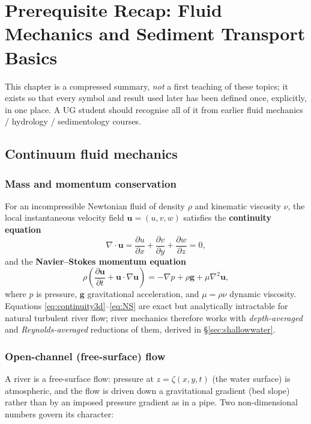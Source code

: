 \documentclass[11pt,a4paper]{report}
\theoremstyle{definition}
\theoremstyle{plain}
\theoremstyle{remark}
\newcommand{\pdv}[2]{\dfrac{\partial #1}{\partial #2}}
\newcommand{\vect}[1]{\boldsymbol{#1}}
\begin{document}
\chapter{Prerequisite Recap: Fluid Mechanics and Sediment Transport Basics}
\label{ch:prereq}

This chapter is a compressed summary, \emph{not} a first teaching of these topics; it exists so that every symbol and result used later has been defined once, explicitly, in one place. A UG student should recognise all of it from earlier fluid mechanics / hydrology / sedimentology courses.

\section{Continuum fluid mechanics}

\subsection{Mass and momentum conservation}
For an incompressible Newtonian fluid of density $\rho$ and kinematic viscosity $\nu$, the local instantaneous velocity field $\vect{u}=(u,v,w)$ satisfies the \textbf{continuity equation}
\begin{equation}
\nabla\cdot\vect{u} = \pdv{u}{x}+\pdv{v}{y}+\pdv{w}{z} = 0,
\label{eq:continuity3d}
\end{equation}
and the \textbf{Navier--Stokes momentum equation}
\begin{equation}
\rho\left(\pdv{\vect{u}}{t} + \vect{u}\cdot\nabla \vect{u}\right) = -\nabla p + \rho \vect{g} + \mu \nabla^2 \vect{u},
\label{eq:NS}
\end{equation}
where $p$ is pressure, $\vect g$ gravitational acceleration, and $\mu=\rho\nu$ dynamic viscosity. Equations \eqref{eq:continuity3d}--\eqref{eq:NS} are exact but analytically intractable for natural turbulent river flow; river mechanics therefore works with \emph{depth-averaged} and \emph{Reynolds-averaged} reductions of them, derived in \S\ref{sec:shallowwater}.

\subsection{Open-channel (free-surface) flow}
A river is a free-surface flow: pressure at $z=\zeta(x,y,t)$ (the water surface) is atmospheric, and the flow is driven down a gravitational gradient (bed slope) rather than by an imposed pressure gradient as in a pipe. Two non-dimensional numbers govern its character:
\end{document}
